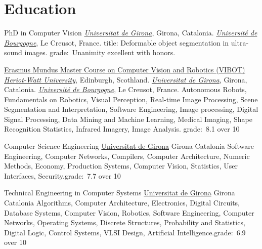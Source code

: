 \section{Education}

{PhD in Computer Vision}
{}
{}
{}
{\href{http://www.udg.edu}{\emph{Universitat de Girona}}, Girona, Catalonia.
  \newline\href{http://www.u-bourgogne.fr}{\emph{Universit\'{e} de Bourgogne}}, Le Creusot, France.
  title: Deformable object segmentation in ultra-sound images.
  \newline grade:~Unanimity excellent with honors.
}

{\href{http://www.vibot.org}{Erasmus Mundus Master Course on Computer Vision and Robotics (VIBOT)}}
{}
{}
{}
{\href{http://www.hw.ac.uk}{\emph{Heriot-Watt University}}, Edinburgh, Scothland.
  \newline\href{http://www.udg.edu}{\emph{Universitat de Girona}}, Girona, Catalonia.
  \newline\href{http://www.u-bourgogne.fr}{\emph{Universit\'{e} de Bourgogne}}, Le Creusot, France.
  \newline
Autonomous Robots, Fundamentals on Robotics, Visual Perception, Real-time Image Processing, Scene Segmentation and Interpretation, Software Engineering, Image processing, Digital Signal Processing, Data Mining and Machine Learning, Medical Imaging, Shape Recognition Statistics, Infrared Imagery, Image Analysis.
  \newline grade:~8.1 over 10
}

                {Computer Science Engineering}
                {\newline\href{http://www.udg.edu}{Universitat de Girona}}
                {Girona}
                {Catalonia}
                {Software Engineering, Computer Networks, Compilers, Computer Architecture, Numeric Methods, Economy, Production Systems, Computer Vision, Statistics, User Interfaces, Security.\newline grade:~7.7 over 10
                }

                {Technical Engineering in Computer Systems}
                {\newline\href{http://www.udg.edu}{Universitat de Girona}}
                {Girona}
                {Catalonia}
                {Algorithms, Computer Architecture, Electronics, Digital Circuits, Database Systems, Computer Vision, Robotics, Software Engineering, Computer Networks, Operating Systems, Discrete Structures, Probability and Statistics, Digital Logic, Control Systems, VLSI Design, Artificial Intelligence.\newline grade:~6.9 over 10}

